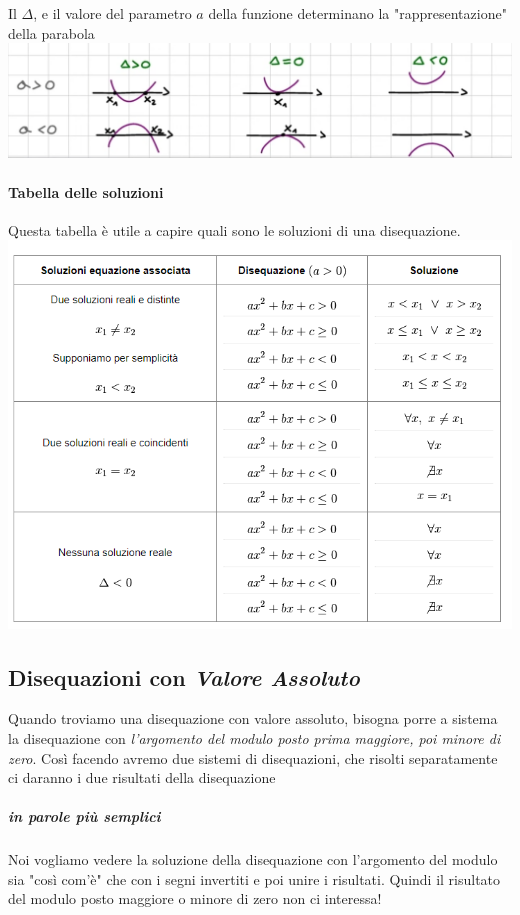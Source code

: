 \documentclass[12pt, a4paper, openany]{book}
\begin{document}
Il $\Delta$, e il valore del parametro $a$ della funzione determinano la "rappresentazione" della parabola
\\\includegraphics[width=\textwidth]{parabole-delta.png}

\paragraph*{Tabella delle soluzioni} Questa tabella è utile a capire quali sono le soluzioni di una disequazione.
\\\includegraphics[width=\textwidth]{disequazioni.png}


\subsection*{Disequazioni con \emph{Valore Assoluto}}
Quando troviamo una disequazione con valore assoluto, bisogna porre a sistema la disequazione con \emph{l'argomento del modulo posto prima maggiore, poi minore di zero}.
Così facendo avremo due sistemi di disequazioni, che risolti separatamente ci daranno i due risultati della disequazione
\subparagraph{in parole più semplici} Noi vogliamo vedere la soluzione della disequazione con l'argomento del modulo sia "così com'è" che con i segni invertiti e poi unire i risultati.
Quindi il risultato del modulo posto maggiore o minore di zero non ci interessa! 
\end{document}
